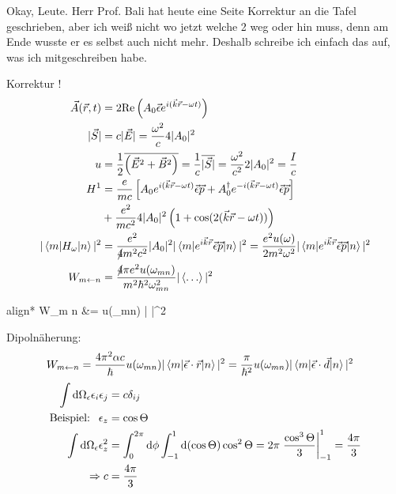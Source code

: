 	 Okay, Leute. Herr Prof. Bali hat heute eine Seite Korrektur an die Tafel geschrieben, aber ich weiß nicht wo jetzt welche 2 weg oder hin muss, denn am Ende wusste er es selbst auch nicht mehr. Deshalb schreibe ich einfach das auf, was ich mitgeschreiben habe. 

	Korrektur ! 
		\begin{align*}
			\vec{A} (\vec{r} , t) &=
			2 \mathrm{Re} \left(
				A_0 \vec{\epsilon} e^{i (\vec{k} \vec{r} - \omega t)}
			\right) \\
			|\vec{S}| &=
			c |\vec{E}| = \frac{\omega^2}{c} 4 |A_0|^2 \\
			u &= \frac{1}{2} \overline{\left( \vec{E}^2 + \vec{B}^2 \right)} 
			= \frac{1}{c} \overline{|\vec{S}|} 
			= \frac{\omega^2}{c^2} 2 |A_0|^2 = \frac{I}{c} \\
			H^1 &= \frac{e}{mc} \left[
				A_0 e^{i (\vec{k} \vec{r} - \omega t)} \vec{\epsilon} \vec{p} 
				+ A_0^\dagger e^{-i (\vec{k} \vec{r} - \omega t)} \vec{\epsilon} \vec{p}
			\right] \\
			&+ \frac{e^2}{m c^2} 4 |A_0|^2 \left( 1 + \cos (2 (\vec{k} \vec{r} - \omega t))\right) \\
			| \braket{m | H_\omega | n} |^2 &=	
			\frac{e^2}{4\!\!\!/ m^2 c^2} |A_0|^2
			| \braket{m | e^{i \vec{k} \vec{r}} \vec{\epsilon} \vec{p} | n} |^2 
			= \frac{e^2 u(\omega)}{2 m^2 \omega^2} 
			| \braket{m | e^{i \vec{k} \vec{r}} \vec{\epsilon} \vec{p} | n} |^2 \\
			W_{m \leftarrow n} &= \frac{4\!\!\!/ \pi e^2 u(\omega_{mn})}{m^2 \hbar^2 \omega_{mn}^2}
			|\braket{\ldots}|^2
		\end{align*}
		\begin{empheq}[box=\boxed]{align*}
			W_{m \leftarrow n} &=
			 u(\omega_{mn}) 
			|  |^2
		\end{empheq}
	Dipolnäherung:
		\begin{align*}
			W_{m \leftarrow n} &=
			\frac{4 \pi^2 \alpha c}{\hbar} u(\omega_{mn}) 
			| \braket{m | \vec{\epsilon} \cdot \vec{r} | n} |^2 
			= \frac{\pi}{\hbar^2} u(\omega_{mn}) 
			| \braket{m | \vec{\epsilon} \cdot \vec{d} | n} |^2
		\end{align*}
		\begin{align*}
			\int \mathrm{d} \Omega_\epsilon \epsilon_i \epsilon_j &= c \delta_{ij} \\
			\text{Beispiel: ~} \epsilon_z &= \cos \Theta \\
			\int \mathrm{d} \Omega_\epsilon \epsilon_z^2 &= 
			\int_{0}^{2 \pi} \mathrm{d} \phi \int_{-1}^{1} \mathrm{d} (\cos \Theta) \cos^2 \Theta 
			= 2 \pi \left. \frac{\cos^3 \Theta}{3} \right|_{-1}^1 = \frac{4 \pi}{3} \\
			\Rightarrow c &= \frac{4 \pi}{3} 
	 	\end{align*}
